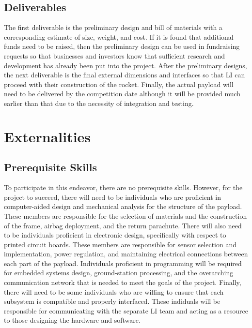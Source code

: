 \documentclass[conference]{IEEEtran} %
\begin{document}
\subsection{Deliverables}
\label{subsec:Deliverables}
The first deliverable is the preliminary design and bill of materials with a corresponding estimate of size, weight, and
cost. If it is found that additional funds need to be raised, then the preliminary design can be used in fundraising requests
so that businesses and investors know that sufficient research and development has already been put into the project. After the
preliminary designs, the next deliverable is the final external dimensions and interfaces so that LI can proceed with their
construction of the rocket. Finally, the actual payload will need to be delivered by the competition date although it will be provided
much earlier than that due to the necessity of integration and testing.

\section{Externalities}
\label{subsec:Externalities}
\subsection{Prerequisite Skills}
\label{subsec:Prerequisite Skills}
To participate in this endeavor, there are no prerequisite skills. However, for the project to succeed, there will need to be
individuals who are proficient in computer-aided design and mechanical analysis for the structure of the payload. These members
are responsible for the selection of materials and the construction of the frame, airbag deployment, and the return parachute.
There will also need to be individuals proficient in electronic design, specifically with respect to printed circuit boards.
These members are responsible for sensor selection and implementation, power regulation, and maintaining electrical connections
between each part of the payload. Individuals proficient in programming will be required for embedded systems design, ground-station processing,
and the overarching communication network that is needed to meet the goals of the project.  Finally, there will need to be some individuals
who are willing to ensure that each subsystem is compatible and properly interfaced. These indiduals will be responsible for communicating with
the separate LI team and acting as a resource to those designing the hardware and software.
\end{document}
